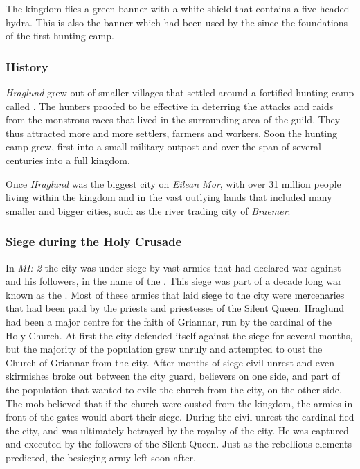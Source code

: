 The kingdom flies a green banner with a white shield that contains a five
headed hydra. This is also the banner which had been used by the
 since the foundations of the first hunting camp.

\subsubsection{History}

\emph{Hraglund} grew out of smaller villages that settled around a fortified
hunting camp called . The hunters proofed to be
effective in deterring the attacks and raids from the monstrous races that
lived in the surrounding area of the guild. They thus attracted more and more
settlers, farmers and workers. Soon the hunting camp grew, first into a small
military outpost and over the span of several centuries into a full kingdom.

Once \emph{Hraglund} was the biggest city on \emph{Eilean Mor}, with over
31 million people living within the kingdom and in the vast outlying lands
that included many smaller and bigger cities, such as the river trading city
of \emph{Braemer}.

\subsubsection{Siege during the Holy Crusade}
\label{sec:Siege of Hraglund}

In \emph{MI:-2} the city was under siege by vast armies that had declared war
against  and his followers, in the name of the
. This siege was part of a decade long war known as
the . Most of these armies that laid siege to the
city were mercenaries that had been paid by the priests and priestesses of the
Silent Queen. Hraglund had been a major centre for the faith of Griannar, run
by the cardinal of the Holy Church. At first the city defended itself against
the siege for several months, but the majority of the population grew unruly
and attempted to oust the Church of Griannar from the city. After months of
siege civil unrest and even skirmishes broke out between the city guard,
believers on one side, and part of the population that wanted to exile the
church from the city, on the other side. The mob believed that if the church
were ousted from the kingdom, the armies in front of the gates would abort
their siege. During the civil unrest the cardinal fled the city, and was
ultimately betrayed by the royalty of the city. He was captured and executed
by the followers of the Silent Queen. Just as the rebellious elements
predicted, the besieging army left soon after.

